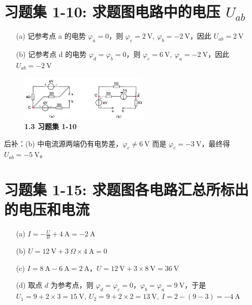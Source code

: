 \documentclass[UTF8]{report}
\theoremstyle{MyLineTheoremStyle} %
\theoremstyle{MyBlockTheoremStyle} %
\theoremstyle{MySubsubsectionStyle} %
\begin{document}
\section{习题集 1-10: 求题图电路中的电压 $U_{ab}$}



\begin{enumerate}
\item[(a)] 
记参考点 a 的电势 $\varphi_a=0$，则 $\varphi_c = 2\ \mathrm{V} ,\ \varphi_b = -2\ \mathrm{V}$，因此 $U_{ab} = 2\ \mathrm{V}$

\item[(b)] 
记参考点 d 的电势 $\varphi_d = \varphi_b =0$，则 $\varphi_c = 6\ \mathrm{V},\ \varphi_a = -2\ \mathrm{V}$，因此 $U_{ab} = -2\ \mathrm{V}$

\end{enumerate}

\begin{figure}[H]\centering
\includegraphics[width=0.55\textwidth]{assets/1/9dda9e5f333b8cb7f498d15c015e5fd0.png}
\caption{\bfseries 1.3 习题集 1-10}
\end{figure}
{\par\color{gray}\small
后补：(b) 中电流源两端仍有电势差，$\varphi_c \ne 6 \ \mathrm{V}$ 而是 $ \varphi_c = -3\ \mathrm{V} $，最终得 $U_{ab} = -5 \ \mathrm{V}$。
\par}


\section{习题集 1-15: 求题图各电路汇总所标出的电压和电流}

\begin{enumerate}
    \item[(a)] $I = -\frac{U}{R} + 4\ \mathrm{A} = -2 \ \mathrm{A}$
    \item[(b)] $U =12 \ \mathrm{V} + 3\ \Omega \times 4 \ \mathrm{A} = 0 $ 
    \item[(c)] $I = 8 \ \mathrm{A} - 6\ \mathrm{A} = 2 \ \mathrm{A}$，$ U = 12 \ \mathrm{V} + 3\times8 \ \mathrm{V} = 36 \ \mathrm{V}$ 
    \item[(d)] 取点 $ d $ 为参考点，则 $\varphi_d = \varphi_c = 0$，$\varphi_b = \varphi_a = 9 \ \mathrm{V}$，于是 $U_1 = 9 + 2\times3 = 15\ \mathrm{V},\ U_2 = 9 + 2\times 2 = 13 \ \mathrm{V},\ I =2 -  (9-3) = - 4 \ \mathrm{A}$
\end{enumerate}
\end{document}
